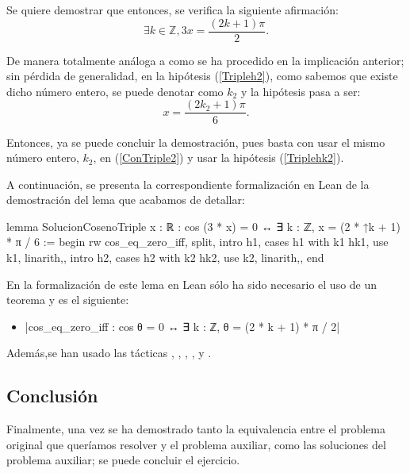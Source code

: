 \begin{demostracion}
  Se quiere demostrar que entonces, se verifica la siguiente afirmación:
  \begin{equation}\label{ConTriple2}
    ∃ k ∈ ℤ, 3x = \frac{(2k+1)π}{2}.
  \end{equation}

  De manera totalmente análoga a como se ha procedido en la implicación
  anterior; sin pérdida de generalidad, en la hipótesis
  (\ref{Tripleh2}), como sabemos que existe dicho número entero, se
  puede denotar como \(k_2\) y la hipótesis pasa a ser:
  \begin{equation}\label{Triplehk2}\tag{hk2}
     x = \frac{(2k_2+1)π}{6}.
   \end{equation}

   Entonces, ya se puede concluir la demostración, pues basta con usar
   el mismo número entero, \(k_2\), en (\ref{ConTriple2}) y usar la
   hipótesis (\ref{Triplehk2}).
\end{demostracion}

A continuación, se presenta la correspondiente formalización en Lean de
la demostración del lema que acabamos de detallar:
\begin{leancode}
lemma SolucionCosenoTriple
  {x : ℝ}
  : cos (3 * x) = 0 ↔ ∃ k : ℤ, x = (2 * ↑k + 1) * π / 6 :=
begin
  rw cos_eq_zero_iff,
  split,
  { intro h1,
    cases h1 with k1 hk1,
    use k1,
    linarith,},
  { intro h2,
    cases h2 with k2 hk2,
    use k2,
    linarith,},
end
\end{leancode}

En la formalización de este lema en Lean sólo ha sido necesario el uso
de un teorema y es el siguiente:
\begin{itemize}
\item {}|cos_eq_zero_iff : cos θ = 0 ↔ ∃ k : ℤ, θ = (2 * k + 1) * π / 2|
\end{itemize}
Además,se han usado las tácticas
,
,
,
,
 y
.

\subsection{Conclusión}

Finalmente, una vez se ha demostrado tanto la equivalencia entre el
problema original que queríamos resolver y el problema auxiliar, como
las soluciones del problema auxiliar; se puede concluir el ejercicio.

